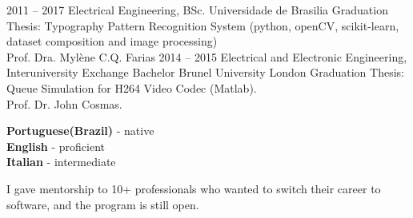 \documentclass[9pt]{developercv} %
\begin{document}


\begin{entrylist}
	\entry
		{2011 -- 2017}
		{Electrical Engineering, BSc.}
		{Universidade de Brasilia}
		{Graduation Thesis: Typography Pattern Recognition System (python, openCV, scikit-learn, dataset composition and image processing)\\
Prof. Dra. Mylène C.Q. Farias}
	\entry
		{2014 -- 2015}
		{Electrical and Electronic Engineering, Interuniversity Exchange Bachelor}
		{Brunel University London}
		{Graduation Thesis: Queue Simulation for H264 Video Codec (Matlab).\\
Prof. Dr. John Cosmas.}
\end{entrylist}


\begin{minipage}[t]{0.5\textwidth}
	\vspace{-\baselineskip} %

	
	\textbf{Portuguese(Brazil)} - native\\
	\textbf{English} - proficient\\
	\textbf{Italian} - intermediate
\end{minipage}
\hfill
\begin{minipage}[t]{0.5\textwidth}
	\vspace{-\baselineskip} %
	
	
	I gave mentorship to 10+ professionals who wanted to switch their career to software, and the program is still open. 
\end{minipage}

\end{document}
